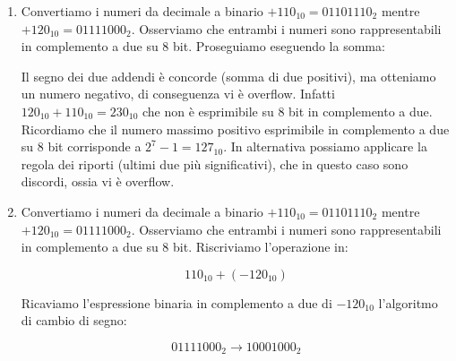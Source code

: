 \documentclass{article}
\begin{document}
\begin{enumerate}
    \item Convertiamo i numeri da decimale a binario $+110_{10}=01101110_{2}$ mentre $+120_{10}=01111000_{2}$. Osserviamo che entrambi i numeri sono rappresentabili in complemento a due su 8 bit. Proseguiamo eseguendo la somma:

\begin{center}
\end{center}


Il segno dei due addendi \`e concorde (somma di due positivi), ma otteniamo un numero negativo, di conseguenza vi \`e overflow. Infatti $120_{10}+110_{10} = 230_{10}$ che non \`e esprimibile su 8 bit in complemento a due. Ricordiamo che il numero massimo positivo esprimibile in complemento a due su 8 bit corrisponde a $2^{7}-1 = 127_{10}$. In alternativa possiamo applicare la regola dei riporti (ultimi due pi\`u significativi), che in questo caso sono discordi, ossia vi \`e overflow.


\item Convertiamo i numeri da decimale a binario $+110_{10}=01101110_{2}$ mentre $+120_{10}=01111000_{2}$. Osserviamo che entrambi i numeri sono rappresentabili in complemento a due su 8 bit. Riscriviamo l'operazione in:

$$110_{10} + (-120_{10}) $$

Ricaviamo l'espressione binaria in complemento a due di $-120_{10}$ l'algoritmo di cambio di segno:

$$01111000_{2} \rightarrow 10001000_{2} $$


\end{enumerate}
\end{document}
